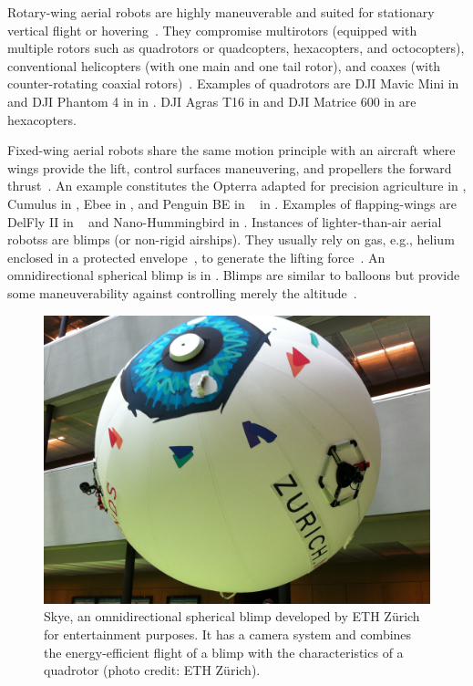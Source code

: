 Rotary-wing aerial robots are highly maneuverable and suited for stationary vertical flight or hovering~\citep{siciliano2016springer}. They compromise multirotors (equipped with multiple rotors such as quadrotors or quadcopters, hexacopters, and octocopters), conventional helicopters (with one main and one tail rotor), and coaxes (with counter-rotating coaxial rotors)~\citep{corke2017robotics}. Examples of quadrotors are DJI Mavic Mini in  and DJI Phantom 4 in  in . DJI Agras T16 in  and DJI Matrice 600 in  are hexacopters.

Fixed-wing aerial robots share the same motion principle with an aircraft where wings provide the lift, control surfaces maneuvering, and propellers the forward thrust~\citep{corke2017robotics}. An example constitutes the Opterra adapted for precision agriculture in , Cumulus in , Ebee in , and Penguin BE in ~\citep{haugen2016monitoring} in . Examples of flapping-wings are DelFly II in ~\citep{percin2012flow,groen2010improving,clercq2009aerodynamic} and Nano-Hummingbird in . Instances of lighter-than-air aerial robotss are blimps (or non-rigid airships). They usually rely on gas, e.g., helium enclosed in a protected envelope~\citep{burri2013design}, to generate the lifting force~\citep{fui2017recent}. An omnidirectional spherical blimp is in . Blimps are similar to balloons but provide some maneuverability against controlling merely the altitude~\citep{colombatti2011lighter}.
\begin{figure}[t]
  \centering
  \includegraphics[width=.7\textwidth]{pictures/IMG_2612}
  \caption[Skye, an omnidirectional spherical blimp]{Skye, an omnidirectional spherical blimp developed by ETH Z\"urich for entertainment purposes. It has a camera system and combines the energy-efficient flight of a blimp with the characteristics of a quadrotor {\scriptsize(photo credit: ETH Z\"urich)}.}   
  \label{fig:skye-blimp}
\end{figure}

